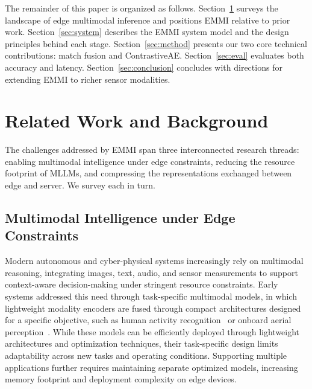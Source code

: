\documentclass[10pt,twocolumn]{article}
\begin{document}
The remainder of this paper is organized as follows.
Section~\ref{sec:related} surveys the landscape of edge
multimodal inference and positions EMMI relative to prior work.
Section~\ref{sec:system} describes the EMMI system model and
the design principles behind each stage.
Section~\ref{sec:method} presents our two core technical
contributions: match fusion and ContrastiveAE.
Section~\ref{sec:eval} evaluates both accuracy and latency.
Section~\ref{sec:conclusion} concludes with directions for
extending EMMI to richer sensor modalities.


\section{Related Work and Background}
\label{sec:related}

The challenges addressed by EMMI span three interconnected
research threads: enabling multimodal intelligence under edge
constraints, reducing the resource footprint of MLLMs, and
compressing the representations exchanged between edge and
server. We survey each in turn.

\subsection{Multimodal Intelligence under Edge Constraints}

Modern autonomous and cyber-physical systems increasingly rely on
multimodal reasoning, integrating images, text, audio, and sensor
measurements to support context-aware decision-making under
stringent resource constraints. Early systems addressed this need
through task-specific multimodal models, in which lightweight modality
encoders are fused through compact architectures designed for a specific
objective, such as human activity recognition~\cite{har1,har2} or
onboard aerial perception~\cite{aerial1,aerial2}. While these models
can be efficiently deployed through lightweight architectures and
optimization techniques, their task-specific design limits adaptability
across new tasks and operating conditions. Supporting multiple
applications further requires maintaining separate optimized models,
increasing memory footprint and deployment complexity on edge devices.
\end{document}
